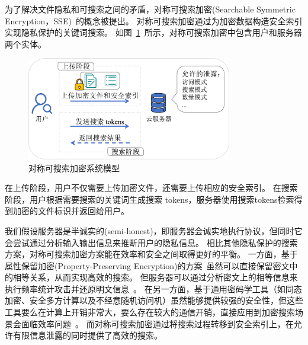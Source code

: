 为了解决文件隐私和可搜索之间的矛盾，对称可搜索加密(Searchable Symmetric Encryption，SSE)~\cite{song2000practical,curtmola2006searchable}的概念被提出。
对称可搜索加密通过为加密数据构造安全索引实现隐私保护的关键词搜索。
如图~\ref{fig:sse_protocol}~所示，对称可搜索加密中包含用户和服务器两个实体。
\begin{figure}[ht]
  \centering
  \includegraphics[width=0.8\textwidth]{figures/sse_pro.pdf}
  \caption{对称可搜索加密系统模型}
  \label{fig:sse_protocol}
\end{figure}
在上传阶段，用户不仅需要上传加密文件，还需要上传相应的安全索引。
在搜索阶段，用户根据需要搜索的关键词生成搜索 tokens，服务器使用搜索tokens检索得到加密的文件标识并返回给用户。

我们假设服务器是半诚实的(semi-honest)，即服务器会诚实地执行协议，但同时它会尝试通过分析输入输出信息来推断用户的隐私信息。
相比其他隐私保护的搜索方案，对称可搜索加密方案能在效率和安全之间取得更好的平衡。
一方面，基于属性保留加密(Property-Preserving Encryption)的方案~\cite{bellare2007deterministica}虽然可以直接保留密文中的相等关系，从而实现高效的搜索。
但服务器可以通过分析密文上的相等信息来执行频率统计攻击并还原明文信息~\cite{naveed2015inferencea}。
在另一方面，基于通用密码学工具（如同态加密、安全多方计算以及不经意随机访问机）虽然能够提供较强的安全性，但这些工具要么在计算上开销非常大，要么存在较大的通信开销，直接应用到加密搜索场景会面临效率问题~\cite{ren2023searchable}。
而对称可搜索加密通过将搜索过程转移到安全索引上，在允许有限信息泄露的同时提供了高效的搜索。

